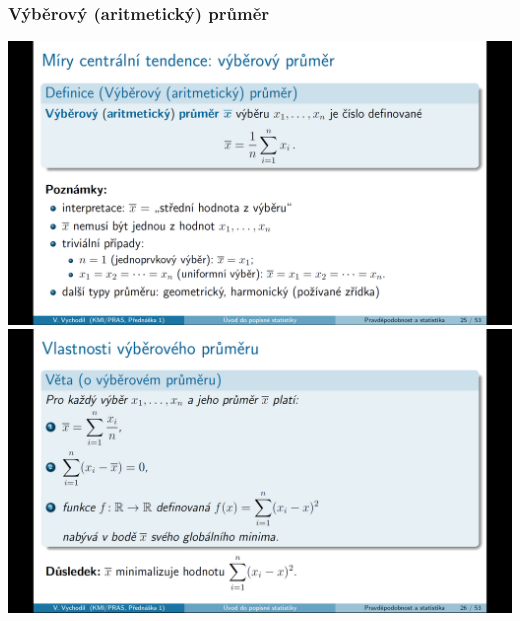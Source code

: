 \documentclass[12pt,a4paper]{article}
\begin{document}
\subsubsection{Výběrový (aritmetický) průměr}
\begin{center}
	\includegraphics[scale=0.32]{img/prumer_definition.png}
	\includegraphics[scale=0.32]{img/prumer_properties.png}
\end{center}
\end{document}
